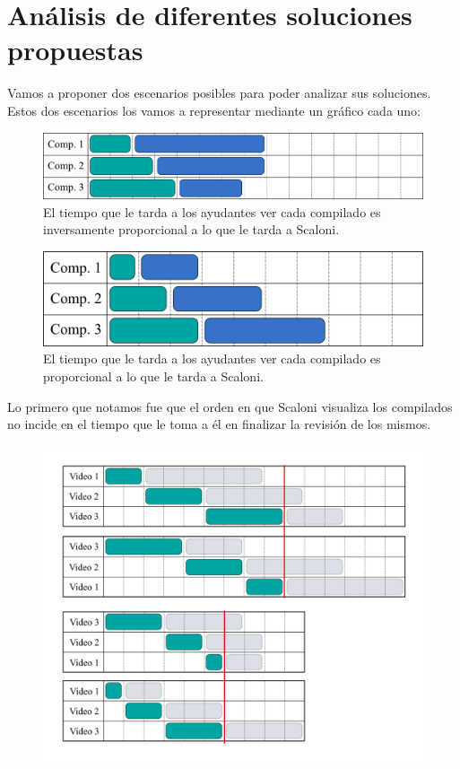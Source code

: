\section{Análisis de diferentes soluciones propuestas}
Vamos a proponer dos escenarios posibles para poder analizar sus soluciones. Estos dos escenarios los vamos a representar mediante un gráfico cada uno:
\begin{figure}[H]
    \centering
    \includegraphics[width=1\textwidth]{img/caso-1.png}
    \caption{El tiempo que le tarda a los ayudantes ver cada compilado es inversamente proporcional a lo que le tarda a Scaloni.}
    \label{fig:Caso 1}
\end{figure}


\begin{figure}[H]
    \centering
    \includegraphics[width=1\textwidth]{img/caso-2.png}
    \caption{El tiempo que le tarda a los ayudantes ver cada compilado es proporcional a lo que le tarda a Scaloni.}
    \label{fig:Caso 2}
\end{figure}

Lo primero que notamos fue que el orden en que Scaloni visualiza los compilados no incide 
en el tiempo que le toma a él en finalizar la revisión de los mismos.

\begin{figure}[H]
    \centering
    \includegraphics[width=1\textwidth]{img/tiempos-scaloni.png}
    \label{fig:Caso 2}
\end{figure}

